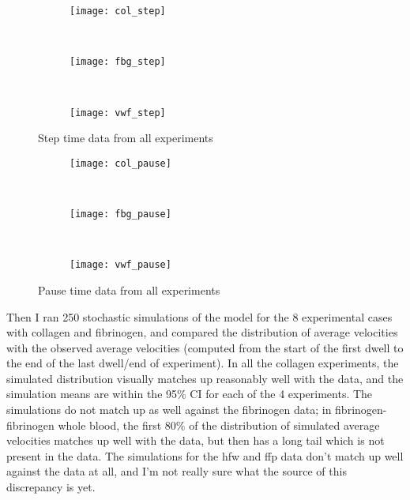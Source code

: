 \documentclass{article}
\begin{document}
\begin{figure}
  \centering
  \begin{subfigure}{0.75\textwidth}
    \texttt{[image: col\_step]}
  \end{subfigure}
  \\
  \begin{subfigure}{0.75\textwidth}
    \texttt{[image: fbg\_step]}
  \end{subfigure}
  \\
  \begin{subfigure}{0.75\textwidth}
    \texttt{[image: vwf\_step]}
  \end{subfigure}
  \caption{Step time data from all experiments}
  \label{fig:step-time}
\end{figure}

\begin{figure}
  \centering
  \begin{subfigure}{0.75\textwidth}
    \texttt{[image: col\_pause]}
  \end{subfigure}
  \\
  \begin{subfigure}{0.75\textwidth}
    \texttt{[image: fbg\_pause]}
  \end{subfigure}
  \\
  \begin{subfigure}{0.75\textwidth}
    \texttt{[image: vwf\_pause]}
  \end{subfigure}
  \caption{Pause time data from all experiments}
  \label{fig:pause-time}
\end{figure}

Then I ran 250 stochastic simulations of the model for the 8
experimental cases with collagen and fibrinogen, and compared the
distribution of average velocities with the observed average
velocities (computed from the start of the first dwell to the end of
the last dwell/end of experiment). In all the collagen experiments,
the simulated distribution visually matches up reasonably well with
the data, and the simulation means are within the 95\% CI for each of
the 4 experiments. The simulations do not match up as well against the
fibrinogen data; in fibrinogen-fibrinogen whole blood, the first 80\%
of the distribution of simulated average velocities matches up well
with the data, but then has a long tail which is not present in the
data. The simulations for the hfw and ffp data don't match up well
against the data at all, and I'm not really sure what the source of this
discrepancy is yet.
\end{document}
